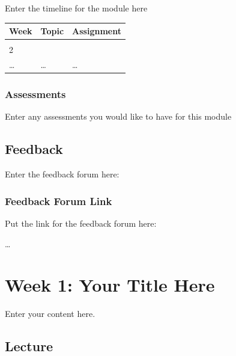 \documentclass[
  letterpaper,
  oneside]{book}
\numberwithin{equation}{section}
\numberwithin{figure}{section}
\theoremstyle{break}
\begin{document}

Enter the timeline for the module here

\begin{longtable}[]{@{}lll@{}}
\toprule\noalign{}
Week & Topic & Assignment \\
\midrule\noalign{}
\endhead
\bottomrule\noalign{}
\endlastfoot
1 & & \\
2 & & \\
\ldots{} & \ldots{} & \ldots{} \\
\end{longtable}

\section*{Assessments}\label{assessments}


Enter any assessments you would like to have for this module


\chapter*{Feedback}\label{feedback}


Enter the feedback forum here:

\section*{Feedback Forum Link}\label{feedback-forum-link}


Put the link for the feedback forum here:

\ldots{}

\part{Week 1: Your Title Here}

Enter your content here.

\chapter*{Lecture}\label{lecture}
\end{document}
